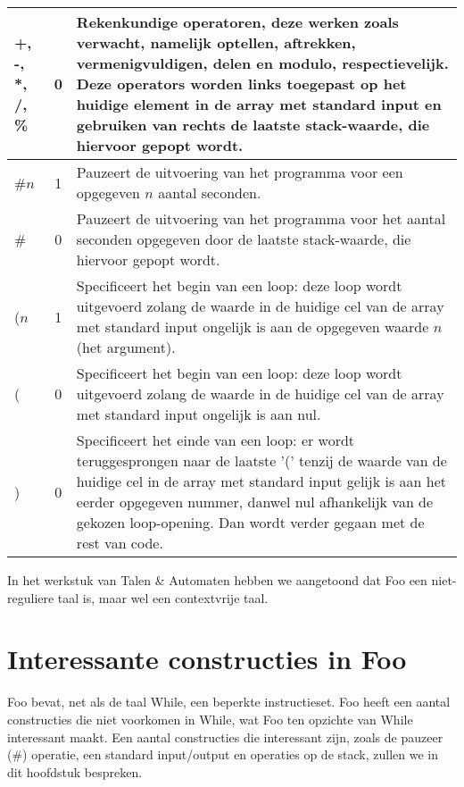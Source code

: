 \documentclass[11pt]{article}
\begin{document}
\begin{center}
\begin{tabular}{ | l | c | p{12cm} | }
    +, -, *, /, \%                          & 0 & Rekenkundige operatoren, deze werken zoals verwacht, namelijk optellen, aftrekken, vermenigvuldigen, delen en modulo, respectievelijk. Deze operators worden links toegepast op het huidige element in de array met standard input en gebruiken van rechts de laatste stack-waarde, die hiervoor gepopt wordt. \\ \hline
    \#\(n\)                                 & 1 & Pauzeert de uitvoering van het programma voor een opgegeven \(n\) aantal seconden. \\ \hline
    \#                                      & 0 & Pauzeert de uitvoering van het programma voor het aantal seconden opgegeven door de laatste stack-waarde, die hiervoor gepopt wordt. \\ \hline
    (\(n\)                                  & 1 & Specificeert het begin van een loop: deze loop wordt uitgevoerd zolang de waarde in de huidige cel van de array met standard input ongelijk is aan de opgegeven waarde \(n\) (het argument). \\ \hline
    (                                       & 0 & Specificeert het begin van een loop: deze loop wordt uitgevoerd zolang de waarde in de huidige cel van de array met standard input ongelijk is aan nul. \\ \hline
    )                                       & 0 & Specificeert het einde van een loop: er wordt teruggesprongen naar de laatste '(' tenzij de waarde van de huidige cel in de array met standard input gelijk is aan het eerder opgegeven nummer, danwel nul afhankelijk van de gekozen loop-opening. Dan wordt verder gegaan met de rest van code. \\ \hline
    \hline
    \end{tabular}
\end{center}


In het werkstuk van Talen \& Automaten hebben we aangetoond dat Foo een niet-reguliere taal is, maar wel een contextvrije taal.

\section{Interessante constructies in Foo}

Foo bevat, net als de taal While, een beperkte instructieset. 
Foo heeft een aantal constructies die niet voorkomen in While, wat Foo ten opzichte van While interessant maakt.
Een aantal constructies die interessant zijn, zoals de pauzeer (\#) operatie, een standard input/output en operaties op de stack, zullen we in dit hoofdstuk bespreken. %
\end{document}
